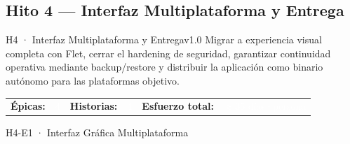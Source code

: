 \documentclass[11pt,a4paper]{article}
\begin{document}
\subsection{Hito 4 — Interfaz Multiplataforma y Entrega}

\begin{hitobox}{H4 · Interfaz Multiplataforma y Entrega}{v1.0}
\small\textcolor{accentlight}{%
  Migrar a experiencia visual completa con Flet, cerrar el hardening de seguridad,
  garantizar continuidad operativa mediante backup/restore y distribuir la aplicación
  como binario autónomo para las plataformas objetivo.
}
\par\vspace{4pt}
\begin{tabular}{@{}lllll@{}}
  \textcolor{accentlight}{\small\textbf{Épicas:}} & \textcolor{white}{\small 4} &
  \textcolor{accentlight}{\small\textbf{Historias:}} & \textcolor{white}{\small 4} &
  \textcolor{accentlight}{\small\textbf{Esfuerzo total:}} \textcolor{white}{\small~$\approx$35 días·persona}
\end{tabular}
\end{hitobox}

\begin{epicbox}{H4-E1 · Interfaz Gráfica Multiplataforma}
\end{epicbox}
\end{document}
